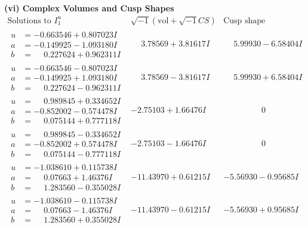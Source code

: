 \documentclass[1p]{elsarticle_modified}
\theoremstyle{definition}
\newcommand{\I}{\sqrt{-1}}
\begin{document}
\newpage\flushleft \textbf{(vi) Complex Volumes and Cusp Shapes}
$$\begin{array}{c|c|c}  
\text{Solutions to }I^u_{1}& \I (\text{vol} + \sqrt{-1}CS) & \text{Cusp shape}\\
 \hline 
\begin{aligned}
u &= -0.663546 + 0.807023 I \\
a &= -0.149925 - 1.093180 I \\
b &= \phantom{-}0.227624 + 0.962311 I\end{aligned}
 & \phantom{-}3.78569 + 3.81617 I & \phantom{-}5.99930 - 6.58404 I \\ \hline\begin{aligned}
u &= -0.663546 - 0.807023 I \\
a &= -0.149925 + 1.093180 I \\
b &= \phantom{-}0.227624 - 0.962311 I\end{aligned}
 & \phantom{-}3.78569 - 3.81617 I & \phantom{-}5.99930 + 6.58404 I \\ \hline\begin{aligned}
u &= \phantom{-}0.989845 + 0.334652 I \\
a &= -0.852002 - 0.574478 I \\
b &= \phantom{-}0.075144 + 0.777118 I\end{aligned}
 & -2.75103 + 1.66476 I & \phantom{-0.000000 } 0 \\ \hline\begin{aligned}
u &= \phantom{-}0.989845 - 0.334652 I \\
a &= -0.852002 + 0.574478 I \\
b &= \phantom{-}0.075144 - 0.777118 I\end{aligned}
 & -2.75103 - 1.66476 I & \phantom{-0.000000 } 0 \\ \hline\begin{aligned}
u &= -1.038610 + 0.115738 I \\
a &= \phantom{-}0.07663 + 1.46376 I \\
b &= \phantom{-}1.283560 - 0.355028 I\end{aligned}
 & -11.43970 + 0.61215 I & -5.56930 - 0.95685 I \\ \hline\begin{aligned}
u &= -1.038610 - 0.115738 I \\
a &= \phantom{-}0.07663 - 1.46376 I \\
b &= \phantom{-}1.283560 + 0.355028 I\end{aligned}
 & -11.43970 - 0.61215 I & -5.56930 + 0.95685 I \\ \hline\begin{aligned}

\end{aligned}
\end{array}$$
\end{document}
